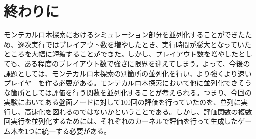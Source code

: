 \documentclass[10pt, a4paper]{jsarticle}
\begin{document}
\section{終わりに}
モンテカルロ木探索におけるシミュレーション部分を並列化することができたため、逐次実行ではプレイアウト数を増やしたとき、実行時間が膨大となっていたところを大幅に短縮することができた。しかし、プレイアウト数を増やしたとしても、ある程度のプレイアウト数で強さに限界を迎えてしまう。よって、今後の課題としては、モンテカルロ木探索の別箇所の並列化を行い、より強くより速いプレイヤーを作る必要がある。モンテカルロ木探索において他に並列化できそうな箇所としては評価を行う関数を並列化することが考えられる。つまり、今回の実験においてある盤面ノードに対して100回の評価を行っていたのを、並列に実行し、高速化を図れるのではないかということである。しかし、評価関数の複数回実行を並列化するためには、それぞれのカーネルで評価を行って生成したゲーム木を1つに統一する必要がある。
\end{document}
